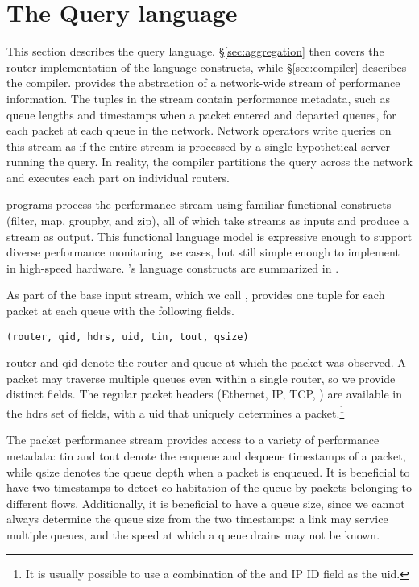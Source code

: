 \section{The \TheSystem Query language}
\label{sec:language}
This section describes the \TheSystem query language.
\S\ref{sec:aggregation} then covers the router implementation of the
language constructs, while \S\ref{sec:compiler} describes the compiler.
\TheSystem provides the abstraction of a network-wide stream of performance
information. The tuples in the stream contain performance metadata, such as
queue lengths and timestamps when a packet entered and departed queues, for
each packet at each queue in the network. Network operators write queries
on this stream as if the entire stream is processed by a single hypothetical
server running the query. In reality, the compiler partitions the query across the
network and executes each part on individual routers.

\TheSystem programs process the performance stream using familiar functional
constructs ({\ct filter}, {\ct map}, {\ct groupby}, and {\ct zip}), all of
which take streams as inputs and produce a stream as output. This functional
language model is expressive enough to support diverse performance monitoring
use cases, but still simple enough to implement in high-speed hardware.
\TheSystem's language constructs are summarized in
.



 As part of the base input stream, which we
call {\ct \pktlog}, \TheSystem provides one tuple for each packet at each queue
with the following fields.
\begin{lstlisting}
(router, qid, hdrs, uid, tin, tout, qsize)
\end{lstlisting}
{\ct router} and {\ct qid} denote the router and queue at which the
packet was observed. A packet may traverse multiple queues even within a single
router, so we provide distinct fields. The regular packet headers (Ethernet,
IP, TCP, \etc) are available in the {\ct hdrs} set of fields, with a {\ct uid}
that uniquely determines a packet.\footnote{It is usually possible to
use a combination of the \txtftuple and IP ID field as the {\ctfoot uid}.}

The packet performance stream provides access to a variety of performance
metadata: {\ct tin} and {\ct tout} denote the enqueue and dequeue timestamps of
a packet, while {\ct qsize} denotes the queue depth when
a packet is enqueued. It is beneficial to have two timestamps to detect
co-habitation of the queue by packets belonging to different flows.
Additionally, it is beneficial to have a queue size, since we cannot always
determine the queue size from the two timestamps: a link may service multiple
queues, and the speed at which a queue drains may not be known. 

